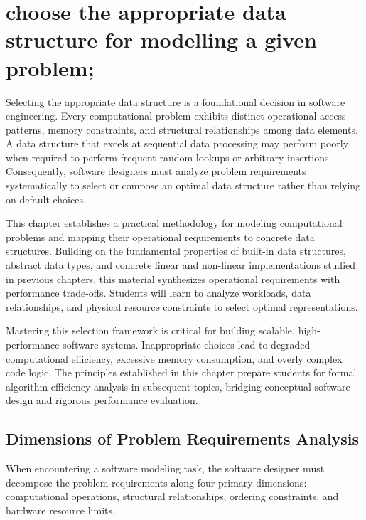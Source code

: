 \documentclass[12pt]{report}
\begin{document}
\pagestyle{plain}
\setcounter{page}{30}
\setcounter{chapter}{3}
\chapter{choose the appropriate data structure for modelling a given problem;}

Selecting the appropriate data structure is a foundational decision in software engineering. Every computational problem exhibits distinct operational access patterns, memory constraints, and structural relationships among data elements. A data structure that excels at sequential data processing may perform poorly when required to perform frequent random lookups or arbitrary insertions. Consequently, software designers must analyze problem requirements systematically to select or compose an optimal data structure rather than relying on default choices.

This chapter establishes a practical methodology for modeling computational problems and mapping their operational requirements to concrete data structures. Building on the fundamental properties of built-in data structures, abstract data types, and concrete linear and non-linear implementations studied in previous chapters, this material synthesizes operational requirements with performance trade-offs. Students will learn to analyze workloads, data relationships, and physical resource constraints to select optimal representations.

Mastering this selection framework is critical for building scalable, high-performance software systems. Inappropriate choices lead to degraded computational efficiency, excessive memory consumption, and overly complex code logic. The principles established in this chapter prepare students for formal algorithm efficiency analysis in subsequent topics, bridging conceptual software design and rigorous performance evaluation.

\section{Dimensions of Problem Requirements Analysis}

When encountering a software modeling task, the software designer must decompose the problem requirements along four primary dimensions: computational operations, structural relationships, ordering constraints, and hardware resource limits.
\end{document}
